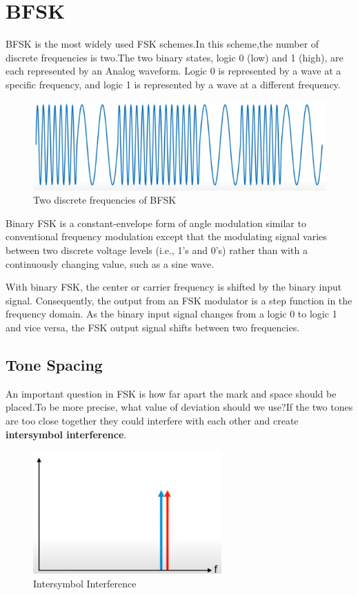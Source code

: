 \documentclass{report}
\begin{document}
	\section{BFSK}{
	\bigskip
	BFSK is the most widely used FSK schemes.In this scheme,the number of discrete frequencies is two.The two binary states, logic 0 (low) and 1 (high), are each represented by an Analog waveform. Logic 0 is represented by a wave at a specific frequency, and logic 1 is represented by a wave at a different frequency.\bigskip
	
	\begin{figure}[H]
		\centering
		\includegraphics[width=\linewidth]{images/1.png}
		\caption{Two discrete frequencies of BFSK}
		\label{fig:}
	\end{figure}
	
	Binary FSK is a constant-envelope form of angle modulation similar to conventional frequency modulation except that the modulating signal varies between two discrete voltage levels (i.e., 1’s and 0’s) rather than with a continuously changing value, such as a sine wave.\bigskip
	
	With binary FSK, the center or carrier frequency is shifted by the binary input signal. Consequently, the output from an FSK modulator is a step function in the frequency domain. As the binary input signal changes from a logic 0 to logic 1 and vice versa, the FSK output signal shifts between two frequencies.
	
	\newpage
	
	\subsection{Tone Spacing}
	 \bigskip 
	  An  important  question  in  FSK is how far apart the mark and space should be placed.To be more precise, what value of deviation should we use?If the two  tones  are  too  close  together  they  could  interfere with each  other and create \textbf{intersymbol interference}.
	  
	  \begin{figure}[H]
	  	\centering
	  	\includegraphics{images/8.png}
	  	\caption{Intersymbol Interference}
	  	\label{fig:}
	  \end{figure}
  
}
\end{document}
